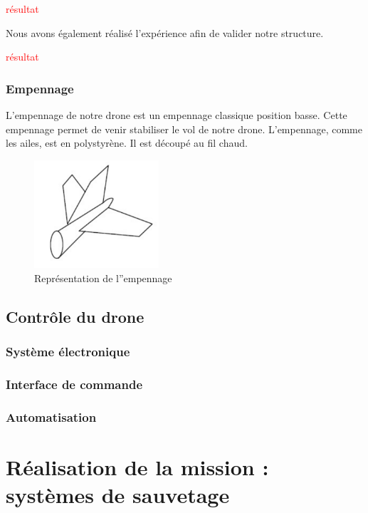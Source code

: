 \documentclass[a4paper,12pt,french]{report}
\begin{document}
\textcolor{red}{résultat}

Nous avons également réalisé l'expérience afin de valider notre structure.\newline

\textcolor{red}{résultat}


\subsection{Empennage}

L'empennage de notre drone est un empennage classique position basse. Cette empennage permet de venir stabiliser le vol de notre drone. L'empennage, comme les ailes, est en polystyrène. Il est découpé au fil chaud.

\begin{figure}[h]
    \centering
    \includegraphics[height=4cm]{figures/emp.jpeg}
    \caption{Représentation de l''empennage}
    \label{flex}
\end{figure}

\newpage
\section{Contrôle du drone}

\subsection{Système électronique}

\subsection{Interface de commande}

\subsection{Automatisation}

\chapter{Réalisation de la mission : systèmes de sauvetage}
\end{document}
